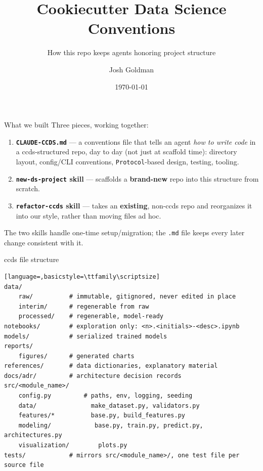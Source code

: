\documentclass[11pt]{beamer}
\title{Cookiecutter Data Science Conventions}
\subtitle{How this repo keeps agents honoring project structure}
\author{Josh Goldman}
\date{\today}
\begin{document}
\maketitle

\begin{frame}{What we built}
  Three pieces, working together:
  \begin{enumerate}
    \item \textbf{\texttt{CLAUDE-CCDS.md}} --- a conventions file that tells
      an agent \emph{how to write code} in a ccds-structured repo, day to
      day (not just at scaffold time): directory layout, config/CLI
      conventions, \texttt{Protocol}-based design, testing, tooling.
    \item \textbf{\texttt{new-ds-project} skill} --- scaffolds a
      \textbf{brand-new} repo into this structure from scratch.
    \item \textbf{\texttt{refactor-ccds} skill} --- takes an
      \textbf{existing}, non-ccds repo and reorganizes it into our style,
      rather than moving files ad hoc.
  \end{enumerate}
  \vspace{0.5em}
  \small The two skills handle one-time setup/migration; the \texttt{.md}
  file keeps every later change consistent with it.
\end{frame}

\begin{frame}[fragile]{ccds file structure}
  \begin{lstlisting}[language=,basicstyle=\ttfamily\scriptsize]
data/
    raw/          # immutable, gitignored, never edited in place
    interim/      # regenerable from raw
    processed/    # regenerable, model-ready
notebooks/        # exploration only: <n>.<initials>-<desc>.ipynb
models/           # serialized trained models
reports/
    figures/      # generated charts
references/       # data dictionaries, explanatory material
docs/adr/         # architecture decision records
src/<module_name>/
    config.py         # paths, env, logging, seeding
    data/               make_dataset.py, validators.py
    features/*          base.py, build_features.py
    modeling/            base.py, train.py, predict.py, architectures.py
    visualization/        plots.py
tests/            # mirrors src/<module_name>/, one test file per source file
\end{lstlisting}
\end{frame}
\end{document}
